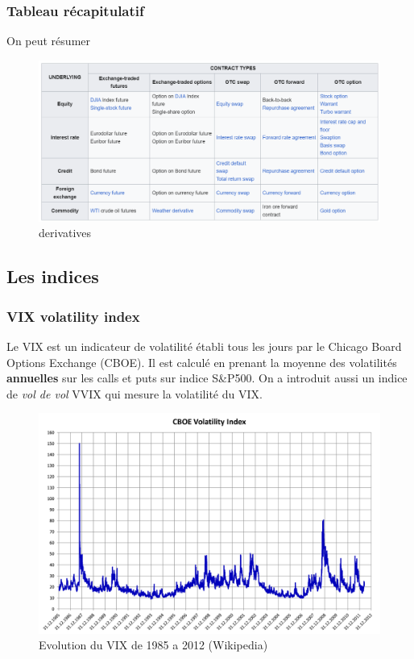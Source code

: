 \documentclass[a4paper]{article}
\begin{document}
\subsubsection{Tableau récapitulatif}
On peut résumer 


\begin{figure}[h!]
\centerline{\includegraphics[scale=0.6]{tableau derivaives.png}}
\caption{derivatives}
\end{figure}

\subsection{Les indices}

\subsubsection{VIX volatility index}

Le VIX est un indicateur de volatilité établi tous les jours par le Chicago Board Options Exchange (CBOE). Il est calculé en prenant la moyenne des volatilités \textbf{annuelles} sur les calls et puts sur indice S\&P500. On a introduit aussi un indice de \textit{vol de vol} VVIX qui mesure la volatilité du VIX.

\begin{figure}[H]
    \centering
    \includegraphics[scale=0.15]{vix.png}
    \caption{Evolution du VIX de 1985 a 2012 (Wikipedia)}
    \label{fig:enter-label}
\end{figure}
\end{document}

